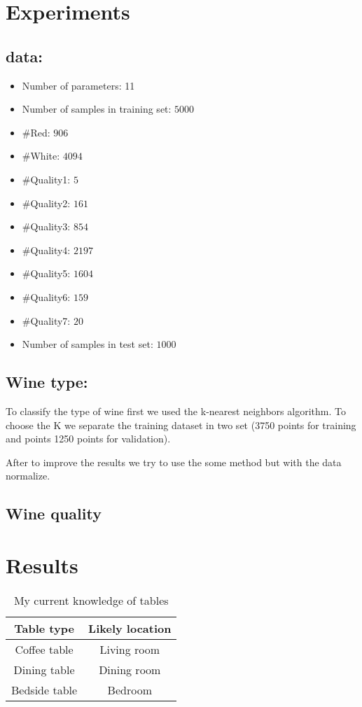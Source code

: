 \documentclass[twoside]{article}
\begin{document}
\begin{multicols}{2}

\section{Experiments}
\subsection*{data:}
\begin{itemize}
  \item Number of parameters: 11
  \item Number of samples in training set: $5000$
  \item \#Red: $906$
  \item \#White: $4094$
  \item \#Quality1: $5$
  \item \#Quality2: $161$
  \item \#Quality3: $854$
  \item \#Quality4: $2197$
  \item \#Quality5: $1604$
  \item \#Quality6: $159$
  \item \#Quality7: $20$
  \item Number of samples in test set: $1000$
\end{itemize}
\subsection*{Wine type:}
\indent \par
To classify the type of wine first we used the k-nearest neighbors algorithm.
To choose the K we separate the training dataset in two set (3750 points for training and points 1250 points for validation). \par
After to improve the results we try to use the some method but with the data normalize.
\subsection*{Wine quality}



\section{Results}


\begin{table}[H]
\caption{My current knowledge of tables}
\centering
\begin{tabular}{cc}
\textbf{Table type} & \textbf{Likely location}\\
\midrule
Coffee table & Living room\\
Dining table & Dining room\\
Bedside table & Bedroom
\end{tabular}
\end{table}


\end{multicols}
\end{document}

